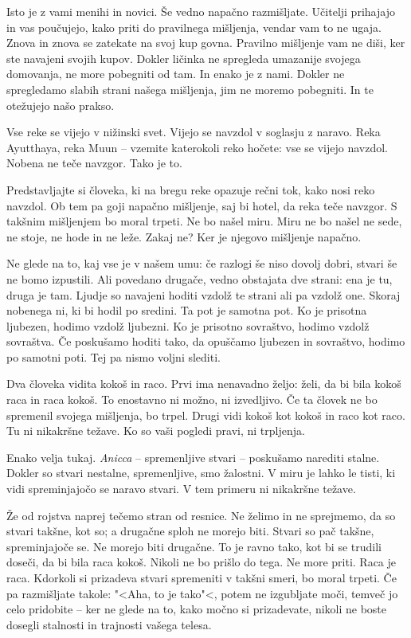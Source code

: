 Isto je z vami menihi in novici. Še vedno napačno razmišljate. Učitelji prihajajo in vas poučujejo, kako priti do pravilnega mišljenja, vendar vam to ne ugaja. Znova in znova se zatekate na svoj kup govna. Pravilno mišljenje vam ne diši, ker ste navajeni svojih kupov. Dokler ličinka ne spregleda umazanije svojega domovanja, ne more pobegniti od tam. In enako je z nami. Dokler ne spregledamo slabih strani našega mišljenja, jim ne moremo pobegniti. In te otežujejo našo prakso.

\clearpage


Vse reke se vijejo v nižinski svet. Vijejo se navzdol v soglasju z naravo. Reka Ayutthaya, reka Muun – vzemite katerokoli reko hočete: vse se vijejo navzdol. Nobena ne teče navzgor. Tako je to.

Predstavljajte si človeka, ki na bregu reke opazuje rečni tok, kako nosi reko navzdol. Ob tem pa goji napačno mišljenje, saj bi hotel, da reka teče navzgor. S takšnim mišljenjem bo moral trpeti. Ne bo našel miru. Miru ne bo našel ne sede, ne stoje, ne hode in ne leže. Zakaj ne? Ker je njegovo mišljenje napačno.


Ne glede na to, kaj vse je v našem umu: če razlogi še niso dovolj dobri, stvari še ne bomo izpustili. Ali povedano drugače, vedno obstajata dve strani: ena je tu, druga je tam. Ljudje so navajeni hoditi vzdolž te strani ali pa vzdolž one. Skoraj nobenega ni, ki bi hodil po sredini. Ta pot je samotna pot. Ko je prisotna ljubezen, hodimo vzdolž ljubezni. Ko je prisotno sovraštvo, hodimo vzdolž sovraštva. Če poskušamo hoditi tako, da opuščamo ljubezen in sovraštvo, hodimo po samotni poti. Tej pa nismo voljni slediti.

\clearpage


Dva človeka vidita kokoš in raco. Prvi ima nenavadno željo: želi, da bi bila kokoš raca in raca kokoš. To enostavno ni možno, ni izvedljivo. Če ta človek ne bo spremenil svojega mišljenja, bo trpel. Drugi vidi kokoš kot kokoš in raco kot raco. Tu ni nikakršne težave. Ko so vaši pogledi pravi, ni trpljenja.

Enako velja tukaj. \emph{Anicca} – spremenljive stvari – poskušamo narediti stalne. Dokler so stvari nestalne, spremenljive, smo žalostni. V miru je lahko le tisti, ki vidi spreminjajočo se naravo stvari. V tem primeru ni nikakršne težave.

Že od rojstva naprej tečemo stran od resnice. Ne želimo in ne sprejmemo, da so stvari takšne, kot so; a drugačne sploh ne morejo biti. Stvari so pač takšne, spreminjajoče se. Ne morejo biti drugačne. To je ravno tako, kot bi se trudili doseči, da bi bila raca kokoš. Nikoli ne bo prišlo do tega. Ne more priti. Raca je raca. Kdorkoli si prizadeva stvari spremeniti v takšni smeri, bo moral trpeti. Če pa razmišljate takole: "<Aha, to je tako"<, potem ne izgubljate moči, temveč jo celo pridobite – ker ne glede na to, kako močno si prizadevate, nikoli ne boste dosegli stalnosti in trajnosti vašega telesa.

